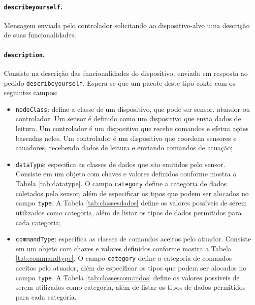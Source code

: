 \paragraph*{\texttt{describeyourself}.} Mensagem enviada pelo controlador solicitando ao dispositivo-alvo uma descrição de suas funcionalidades.

\paragraph*{\texttt{description}.} Consiste na descrição das funcionalidades do dispositivo, enviada em resposta ao pedido \texttt{describeyourself}. Espera-se que um pacote deste tipo conte com os seguintes campos:
\begin{itemize}
	\item \texttt{nodeClass}: define a classe de um dispositivo, que pode ser sensor, atuador ou controlador. Um sensor é definido como um dispositivo que envia dados de leitura. Um controlador é um dispositivo que recebe comandos e efetua ações baseadas neles. Um controlador é um dispositivo que coordena sensores e atuadores, recebendo dados de leitura e enviando comandos de atuação;
	\item \texttt{dataType}: especifica as classes de dados que são emitidos pelo sensor. Consiste em um objeto com chaves e valores definidos conforme mostra a Tabela \ref{tab:datatype}. O campo \texttt{category} define a categoria de dados coletados pelo sensor, além de especificar os tipos que podem ser alocados no campo \texttt{type}. A Tabela \ref{tab:classesdados} define os valores possíveis de serem utilizados como categoria, além de listar os tipos de dados permitidos para cada categoria;
	\item \texttt{commandType}: especifica as classes de comandos aceitos pelo atuador. Consiste em um objeto com chaves e valores definidos conforme mostra a Tabela \ref{tab:commandtype}. O campo \texttt{category} define a categoria de comandos aceitos pelo atuador, além de especificar os tipos que podem ser alocados no campo \texttt{type}. A Tabela \ref{tab:classescomandos} define os valores possíveis de serem utilizados como categoria, além de listar os tipos de dados permitidos para cada categoria.
\end{itemize}

